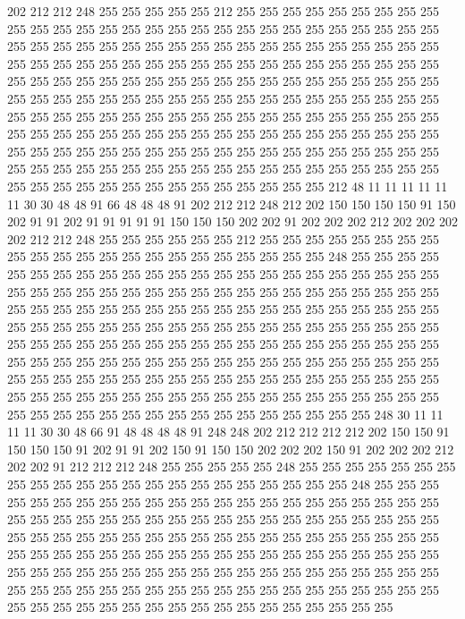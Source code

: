 202 212 212 248 255 255 255 255 255 212 255 255 255 255 255 255 255 255 255 255
255 255 255 255 255 255 255 255 255 255 255 255 255 255 255 255 255 255 255 255
255 255 255 255 255 255 255 255 255 255 255 255 255 255 255 255 255 255 255 255
255 255 255 255 255 255 255 255 255 255 255 255 255 255 255 255 255 255 255 255
255 255 255 255 255 255 255 255 255 255 255 255 255 255 255 255 255 255 255 255
255 255 255 255 255 255 255 255 255 255 255 255 255 255 255 255 255 255 255 255
255 255 255 255 255 255 255 255 255 255 255 255 255 255 255 255 255 255 255 255
255 255 255 255 255 255 255 255 255 255 255 255 255 255 255 255 255 255 255 255
255 255 255 255 255 255 255 255 255 255 255 255 255 255 255 255 255 255 255 255
255 255 255 255 255 255 255 255 255 255 255 255 255 255 255 255 255 255 255 255
255 255 255 255 212 48 11 11 11 11 11 11 30 30 48 48 91 66 48 48
48 91 202 212 212 248 212 202 150 150 150 150 91 150 202 91 91 202 91 91
91 91 91 150 150 150 202 202 91 202 202 202 212 202 202 202 202 212 212 248
255 255 255 255 255 255 212 255 255 255 255 255 255 255 255 255 255 255 255 255
255 255 255 255 255 255 255 255 255 248 255 255 255 255 255 255 255 255 255 255
255 255 255 255 255 255 255 255 255 255 255 255 255 255 255 255 255 255 255 255
255 255 255 255 255 255 255 255 255 255 255 255 255 255 255 255 255 255 255 255
255 255 255 255 255 255 255 255 255 255 255 255 255 255 255 255 255 255 255 255
255 255 255 255 255 255 255 255 255 255 255 255 255 255 255 255 255 255 255 255
255 255 255 255 255 255 255 255 255 255 255 255 255 255 255 255 255 255 255 255
255 255 255 255 255 255 255 255 255 255 255 255 255 255 255 255 255 255 255 255
255 255 255 255 255 255 255 255 255 255 255 255 255 255 255 255 255 255 255 255
255 255 255 255 255 255 255 255 255 255 255 255 255 255 255 255 255 255 255 255
255 255 248 30 11 11 11 11 30 30 48 66 91 48 48 48 48 91 248 248
202 212 212 212 212 202 150 150 91 150 150 150 91 202 91 91 202 150 91 150
150 202 202 202 150 91 202 202 202 212 202 202 91 212 212 212 248 255 255 255
255 255 248 255 255 255 255 255 255 255 255 255 255 255 255 255 255 255 255 255
255 255 255 255 255 248 255 255 255 255 255 255 255 255 255 255 255 255 255 255
255 255 255 255 255 255 255 255 255 255 255 255 255 255 255 255 255 255 255 255
255 255 255 255 255 255 255 255 255 255 255 255 255 255 255 255 255 255 255 255
255 255 255 255 255 255 255 255 255 255 255 255 255 255 255 255 255 255 255 255
255 255 255 255 255 255 255 255 255 255 255 255 255 255 255 255 255 255 255 255
255 255 255 255 255 255 255 255 255 255 255 255 255 255 255 255 255 255 255 255
255 255 255 255 255 255 255 255 255 255 255 255 255 255 255 255 255 255 255 255
